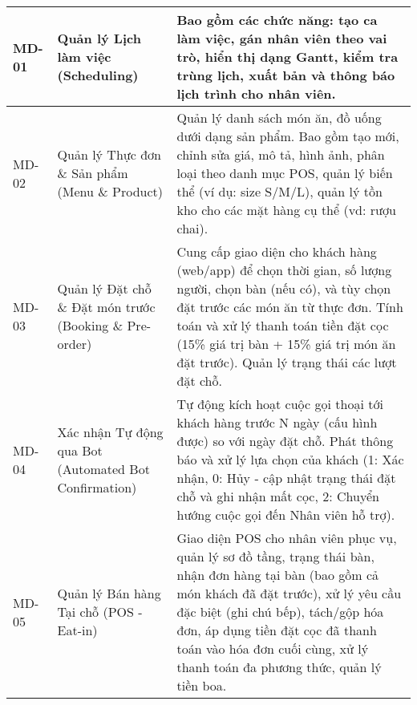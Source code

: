 \begin{longtable}{|m{1.5cm}|m{4.5cm}|m{9cm}|}
	MD-01       & Quản lý Lịch làm việc (Scheduling)                      & Bao gồm các chức năng: tạo ca làm việc, gán nhân viên theo vai trò, hiển thị dạng Gantt, kiểm tra trùng lịch, xuất bản và thông báo lịch trình cho nhân viên.                                                                                                                                                                                                                                                              \\
	\hline
	MD-02       & Quản lý Thực đơn \& Sản phẩm (Menu \& Product)          & Quản lý danh sách món ăn, đồ uống dưới dạng sản phẩm. Bao gồm tạo mới, chỉnh sửa giá, mô tả, hình ảnh, phân loại theo danh mục POS, quản lý biến thể (ví dụ: size S/M/L), quản lý tồn kho cho các mặt hàng cụ thể (vd: rượu chai).                                                                                                                                                                                         \\
	\hline
	MD-03       & Quản lý Đặt chỗ \& Đặt món trước (Booking \& Pre-order) & Cung cấp giao diện cho khách hàng (web/app) để chọn thời gian, số lượng người, chọn bàn (nếu có), và tùy chọn đặt trước các món ăn từ thực đơn. Tính toán và xử lý thanh toán tiền đặt cọc (15\% giá trị bàn + 15\% giá trị món ăn đặt trước). Quản lý trạng thái các lượt đặt chỗ.                                                                                                                                        \\
	\hline
	MD-04       & Xác nhận Tự động qua Bot (Automated Bot Confirmation)   & Tự động kích hoạt cuộc gọi thoại tới khách hàng trước N ngày (cấu hình được) so với ngày đặt chỗ. Phát thông báo và xử lý lựa chọn của khách (1: Xác nhận, 0: Hủy - cập nhật trạng thái đặt chỗ và ghi nhận mất cọc, 2: Chuyển hướng cuộc gọi đến Nhân viên hỗ trợ).                                                                                                                                                       \\
	\hline
	MD-05       & Quản lý Bán hàng Tại chỗ (POS - Eat-in)                 & Giao diện POS cho nhân viên phục vụ, quản lý sơ đồ tầng, trạng thái bàn, nhận đơn hàng tại bàn (bao gồm cả món khách đã đặt trước), xử lý yêu cầu đặc biệt (ghi chú bếp), tách/gộp hóa đơn, áp dụng tiền đặt cọc đã thanh toán vào hóa đơn cuối cùng, xử lý thanh toán đa phương thức, quản lý tiền boa.                                                                                                                   \\

\end{longtable}
